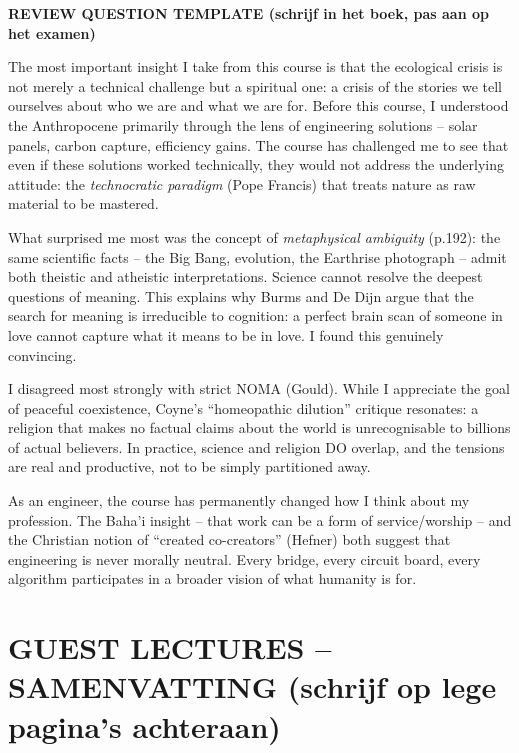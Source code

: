 \documentclass[a4paper,10pt]{article}
\begin{document}
\begin{answerbox}
\textbf{REVIEW QUESTION TEMPLATE (schrijf in het boek, pas aan op het examen)}

The most important insight I take from this course is that the ecological crisis is not merely a technical challenge but a spiritual one: a crisis of the stories we tell ourselves about who we are and what we are for. Before this course, I understood the Anthropocene primarily through the lens of engineering solutions -- solar panels, carbon capture, efficiency gains. The course has challenged me to see that even if these solutions worked technically, they would not address the underlying attitude: the \textit{technocratic paradigm} (Pope Francis) that treats nature as raw material to be mastered.

What surprised me most was the concept of \textit{metaphysical ambiguity} (p.192): the same scientific facts -- the Big Bang, evolution, the Earthrise photograph -- admit both theistic and atheistic interpretations. Science cannot resolve the deepest questions of meaning. This explains why Burms and De Dijn argue that the search for meaning is irreducible to cognition: a perfect brain scan of someone in love cannot capture what it means to be in love. I found this genuinely convincing.

I disagreed most strongly with strict NOMA (Gould). While I appreciate the goal of peaceful coexistence, Coyne's ``homeopathic dilution'' critique resonates: a religion that makes no factual claims about the world is unrecognisable to billions of actual believers. In practice, science and religion DO overlap, and the tensions are real and productive, not to be simply partitioned away.

As an engineer, the course has permanently changed how I think about my profession. The Baha'i insight -- that work can be a form of service/worship -- and the Christian notion of ``created co-creators'' (Hefner) both suggest that engineering is never morally neutral. Every bridge, every circuit board, every algorithm participates in a broader vision of what humanity is for.
\end{answerbox}

\vspace{8pt}

\section{GUEST LECTURES -- SAMENVATTING (schrijf op lege pagina's achteraan)}
\end{document}
